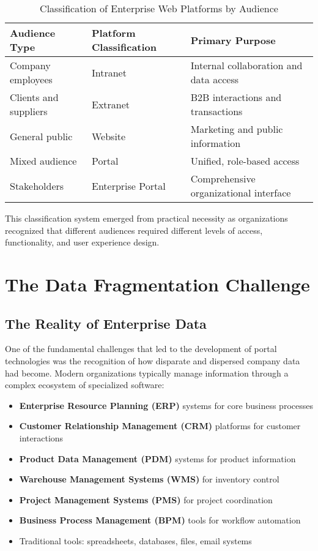 \begin{table}[htbp]
\centering
\caption{Classification of Enterprise Web Platforms by Audience}
\label{tab:audience-classification}
\begin{tabular}{|l|l|l|}
\hline
\textbf{Audience Type} & \textbf{Platform Classification} & \textbf{Primary Purpose} \\
\hline
Company employees & Intranet & Internal collaboration and data access \\
\hline
Clients and suppliers & Extranet & B2B interactions and transactions \\
\hline
General public & Website & Marketing and public information \\
\hline
Mixed audience & Portal & Unified, role-based access \\
\hline
Stakeholders & Enterprise Portal & Comprehensive organizational interface \\
\hline
\end{tabular}
\end{table}

This classification system emerged from practical necessity as organizations recognized that different audiences required different levels of access, functionality, and user experience design.

\section{The Data Fragmentation Challenge}

\subsection{The Reality of Enterprise Data}

One of the fundamental challenges that led to the development of portal technologies was the recognition of how disparate and dispersed company data had become. Modern organizations typically manage information through a complex ecosystem of specialized software:

\begin{itemize}
\item \textbf{Enterprise Resource Planning (ERP)} systems for core business processes
\item \textbf{Customer Relationship Management (CRM)} platforms for customer interactions
\item \textbf{Product Data Management (PDM)} systems for product information
\item \textbf{Warehouse Management Systems (WMS)} for inventory control
\item \textbf{Project Management Systems (PMS)} for project coordination
\item \textbf{Business Process Management (BPM)} tools for workflow automation
\item Traditional tools: spreadsheets, databases, files, email systems
\end{itemize}

